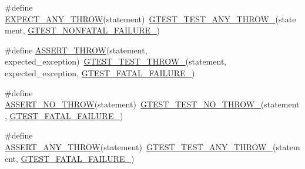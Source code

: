 \begin{DoxyCompactItemize}
\item 
\#define \mbox{\hyperlink{googletest-master_2googletest_2include_2gtest_2gtest_8h_a9be43f44d148e8a8d6a89c864bf4e461}{E\+X\+P\+E\+C\+T\+\_\+\+A\+N\+Y\+\_\+\+T\+H\+R\+OW}}(statement)~\mbox{\hyperlink{_obj__test_2lib_2googletest-release-1_88_81_2googletest_2include_2gtest_2internal_2gtest-internal_8h_af48bbd26d54d4afc5e4cef39b1c76ba3}{G\+T\+E\+S\+T\+\_\+\+T\+E\+S\+T\+\_\+\+A\+N\+Y\+\_\+\+T\+H\+R\+O\+W\+\_\+}}(statement, \mbox{\hyperlink{_obj__test_2lib_2googletest-release-1_88_81_2googletest_2include_2gtest_2internal_2gtest-internal_8h_a6cb7482cfa03661a91c698eb5895f642}{G\+T\+E\+S\+T\+\_\+\+N\+O\+N\+F\+A\+T\+A\+L\+\_\+\+F\+A\+I\+L\+U\+R\+E\+\_\+}})
\item 
\#define \mbox{\hyperlink{googletest-master_2googletest_2include_2gtest_2gtest_8h_aedb1eddae6c2a2430b0e7b7e03b4f052}{A\+S\+S\+E\+R\+T\+\_\+\+T\+H\+R\+OW}}(statement,  expected\+\_\+exception)~\mbox{\hyperlink{_obj__test_2lib_2googletest-release-1_88_81_2googletest_2include_2gtest_2internal_2gtest-internal_8h_a3f71db93eaf30b0cfca9612b9ac32106}{G\+T\+E\+S\+T\+\_\+\+T\+E\+S\+T\+\_\+\+T\+H\+R\+O\+W\+\_\+}}(statement, expected\+\_\+exception, \mbox{\hyperlink{_obj__test_2lib_2googletest-release-1_88_81_2googletest_2include_2gtest_2internal_2gtest-internal_8h_a0f9a4c3ea82cc7bf4478eaffdc168358}{G\+T\+E\+S\+T\+\_\+\+F\+A\+T\+A\+L\+\_\+\+F\+A\+I\+L\+U\+R\+E\+\_\+}})
\item 
\#define \mbox{\hyperlink{googletest-master_2googletest_2include_2gtest_2gtest_8h_a895c34d9b192cdc2ba46d2680623485d}{A\+S\+S\+E\+R\+T\+\_\+\+N\+O\+\_\+\+T\+H\+R\+OW}}(statement)~\mbox{\hyperlink{_obj__test_2lib_2googletest-release-1_88_81_2googletest_2include_2gtest_2internal_2gtest-internal_8h_a9a109d026b5a904646437d7570e13581}{G\+T\+E\+S\+T\+\_\+\+T\+E\+S\+T\+\_\+\+N\+O\+\_\+\+T\+H\+R\+O\+W\+\_\+}}(statement, \mbox{\hyperlink{_obj__test_2lib_2googletest-release-1_88_81_2googletest_2include_2gtest_2internal_2gtest-internal_8h_a0f9a4c3ea82cc7bf4478eaffdc168358}{G\+T\+E\+S\+T\+\_\+\+F\+A\+T\+A\+L\+\_\+\+F\+A\+I\+L\+U\+R\+E\+\_\+}})
\item 
\#define \mbox{\hyperlink{googletest-master_2googletest_2include_2gtest_2gtest_8h_affadeef9379fe5aabf6f28d9eab9d3c0}{A\+S\+S\+E\+R\+T\+\_\+\+A\+N\+Y\+\_\+\+T\+H\+R\+OW}}(statement)~\mbox{\hyperlink{_obj__test_2lib_2googletest-release-1_88_81_2googletest_2include_2gtest_2internal_2gtest-internal_8h_af48bbd26d54d4afc5e4cef39b1c76ba3}{G\+T\+E\+S\+T\+\_\+\+T\+E\+S\+T\+\_\+\+A\+N\+Y\+\_\+\+T\+H\+R\+O\+W\+\_\+}}(statement, \mbox{\hyperlink{_obj__test_2lib_2googletest-release-1_88_81_2googletest_2include_2gtest_2internal_2gtest-internal_8h_a0f9a4c3ea82cc7bf4478eaffdc168358}{G\+T\+E\+S\+T\+\_\+\+F\+A\+T\+A\+L\+\_\+\+F\+A\+I\+L\+U\+R\+E\+\_\+}})

\end{DoxyCompactItemize}
